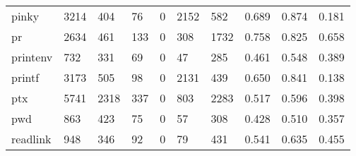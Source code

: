\begin{longtable}{lp{1.3cm}p{1.3cm}p{1.3cm}p{1.3cm}p{1.3cm}p{1.3cm}p{1.3cm}p{1.3cm}p{1.3cm}}
pinky     &                   3214 &                                404 &                                76 &                                0 &                              2152 &                             582 &                                0.689 &                                  0.874 &                                0.181 \\
pr        &                   2634 &                                461 &                               133 &                                0 &                               308 &                            1732 &                                0.758 &                                  0.825 &                                0.658 \\
printenv  &                    732 &                                331 &                                69 &                                0 &                                47 &                             285 &                                0.461 &                                  0.548 &                                0.389 \\
printf    &                   3173 &                                505 &                                98 &                                0 &                              2131 &                             439 &                                0.650 &                                  0.841 &                                0.138 \\
ptx       &                   5741 &                               2318 &                               337 &                                0 &                               803 &                            2283 &                                0.517 &                                  0.596 &                                0.398 \\
pwd       &                    863 &                                423 &                                75 &                                0 &                                57 &                             308 &                                0.428 &                                  0.510 &                                0.357 \\
readlink  &                    948 &                                346 &                                92 &                                0 &                                79 &                             431 &                                0.541 &                                  0.635 &                                0.455 \\

\end{longtable}
